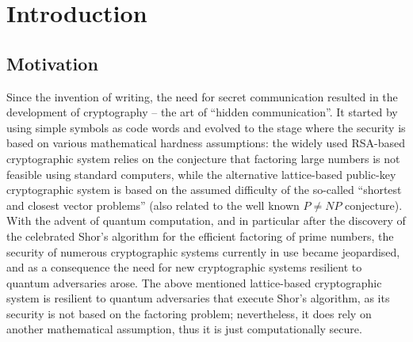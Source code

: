 


%

\chapter{Introduction}

\section{Motivation}

Since the invention of writing, the need for secret communication resulted in the development of cryptography -- the art of ``hidden communication''.  It started by using simple symbols as code words and evolved to the stage where the security is based on various mathematical hardness assumptions: the widely used RSA-based cryptographic system\cite{riv:sha:adl:78} relies on the conjecture that factoring large numbers is not feasible using standard computers, while the alternative lattice-based public-key cryptographic system\cite{gol:gol:hal:97} is based on the assumed difficulty of the so-called ``shortest and closest vector problems'' (also related to the well known $P\neq NP$ conjecture\cite{fort:13}). 
%
With the advent of quantum computation, and in particular after the discovery of the celebrated Shor's algorithm for the efficient factoring of prime numbers\cite{sho:97}, the security of numerous cryptographic systems currently in use became jeopardised, and as a consequence the need for new cryptographic systems resilient to quantum adversaries arose. The above mentioned lattice-based cryptographic system is resilient to quantum adversaries that execute Shor's algorithm, as its security is not based on the factoring problem; nevertheless, it does rely on another mathematical assumption, thus it is just computationally  secure. 
